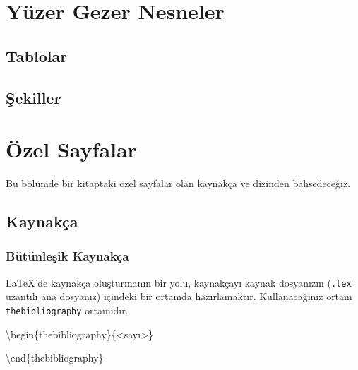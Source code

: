 \documentclass[
  letterpaper,
  DIV=11,
  numbers=noendperiod]{scrreprt}
\newenvironment{Shaded}{\begin{snugshade}}{\end{snugshade}}
\newcommand{\ExtensionTok}[1]{\textcolor[rgb]{0.00,0.23,0.31}{#1}}
\newcommand{\KeywordTok}[1]{\textcolor[rgb]{0.00,0.23,0.31}{#1}}
\newcommand{\NormalTok}[1]{\textcolor[rgb]{0.00,0.23,0.31}{#1}}
\begin{document}

\hypertarget{yuxfczer-gezer-nesneler}{%
\chapter{Yüzer Gezer Nesneler}\label{yuxfczer-gezer-nesneler}}

\hypertarget{tablolar}{%
\section{Tablolar}\label{tablolar}}

\hypertarget{ux15fekiller}{%
\section{Şekiller}\label{ux15fekiller}}


\hypertarget{uxf6zel-sayfalar}{%
\chapter{Özel Sayfalar}\label{uxf6zel-sayfalar}}

Bu bölümde bir kitaptaki özel sayfalar olan kaynakça ve dizinden
bahsedeceğiz.

\hypertarget{kaynakuxe7a}{%
\section{Kaynakça}\label{kaynakuxe7a}}

\hypertarget{buxfctuxfcnleux15fik-kaynakuxe7a}{%
\subsection{Bütünleşik
Kaynakça}\label{buxfctuxfcnleux15fik-kaynakuxe7a}}

{\LaTeX}'de kaynakça oluşturmanın bir yolu, kaynakçayı kaynak dosyanızın
(\texttt{.tex} uzantılı ana dosyanız) içindeki bir ortamda
hazırlamaktır. Kullanacağınız ortam \texttt{thebibliography} ortamıdır.

\begin{Shaded}
\begin{Highlighting}[]
\KeywordTok{\textbackslash{}begin}\NormalTok{\{}\ExtensionTok{thebibliography}\NormalTok{\}\{\textless{}sayı\textgreater{}\}}

\KeywordTok{\textbackslash{}end}\NormalTok{\{}\ExtensionTok{thebibliography}\NormalTok{\}}
\end{Highlighting}
\end{Shaded}
\end{document}

